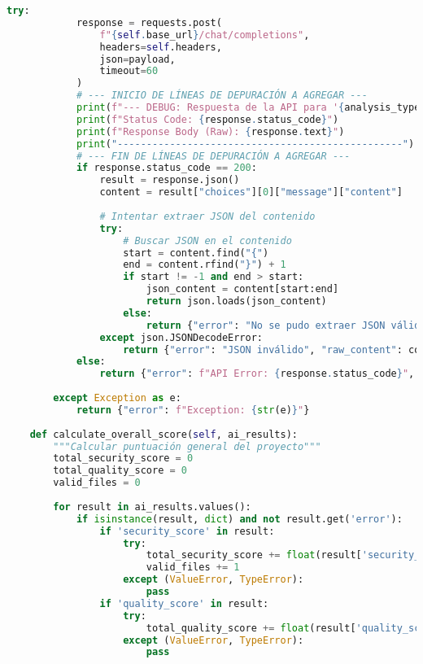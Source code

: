 \begin{lstlisting}[language=python, caption={Contenido completo del script ai\_analyzer.py.}, label={lst:python_script}]
        try:
            response = requests.post(
                f"{self.base_url}/chat/completions",
                headers=self.headers,
                json=payload,
                timeout=60
            )
            # --- INICIO DE LÍNEAS DE DEPURACIÓN A AGREGAR ---
            print(f"--- DEBUG: Respuesta de la API para '{analysis_type}' ---")
            print(f"Status Code: {response.status_code}")
            print(f"Response Body (Raw): {response.text}")
            print("-------------------------------------------------")
            # --- FIN DE LÍNEAS DE DEPURACIÓN A AGREGAR ---
            if response.status_code == 200:
                result = response.json()
                content = result["choices"][0]["message"]["content"]
                
                # Intentar extraer JSON del contenido
                try:
                    # Buscar JSON en el contenido
                    start = content.find("{")
                    end = content.rfind("}") + 1
                    if start != -1 and end > start:
                        json_content = content[start:end]
                        return json.loads(json_content)
                    else:
                        return {"error": "No se pudo extraer JSON válido", "raw_content": content}
                except json.JSONDecodeError:
                    return {"error": "JSON inválido", "raw_content": content}
            else:
                return {"error": f"API Error: {response.status_code}", "message": response.text}
                
        except Exception as e:
            return {"error": f"Exception: {str(e)}"}
    
    def calculate_overall_score(self, ai_results):
        """Calcular puntuación general del proyecto"""
        total_security_score = 0
        total_quality_score = 0
        valid_files = 0
        
        for result in ai_results.values():
            if isinstance(result, dict) and not result.get('error'):
                if 'security_score' in result:
                    try:
                        total_security_score += float(result['security_score'])
                        valid_files += 1
                    except (ValueError, TypeError):
                        pass
                if 'quality_score' in result:
                    try:
                        total_quality_score += float(result['quality_score'])
                    except (ValueError, TypeError):
                        pass
        

\end{lstlisting}
